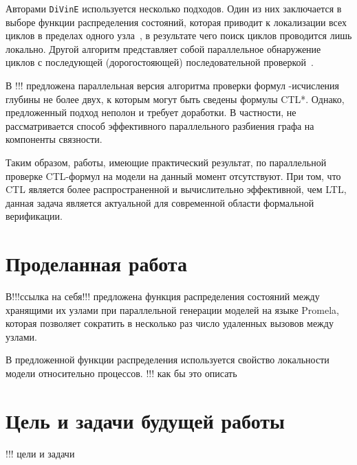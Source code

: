 \documentclass[a4paper,notitlepage,14pt]{article}
\begin{document}
Авторами \texttt{DiVinE} используется несколько подходов. Один из них заключается в выборе
функции распределения состояний, которая приводит к локализации всех циклов в пределах
одного узла~\cite{DLTL1}, в результате чего поиск циклов проводится лишь локально. Другой
алгоритм представляет собой параллельное обнаружение циклов с последующей (дорогостояющей)
последовательной проверкой~\cite{DLTL2}.

В !!! предложена параллельная версия алгоритма проверки формул \mu-исчисления глубины не
более двух, к которым могут быть сведены формулы CTL*. Однако, предложенный подход
неполон и требует доработки. В частности, не рассматривается способ эффективного
параллельного разбиения графа на компоненты связности.

Таким образом, работы, имеющие практический результат, по параллельной проверке CTL-формул
на модели на данный момент отсутствуют. При том, что CTL является более распространенной и
вычислительно эффективной, чем LTL, данная задача является актуальной для современной
области формальной верификации.

\section{Проделанная работа}
\label{sec:my-work}

В!!!ссылка на себя!!! предложена функция распределения состояний между хранящими их узлами
при параллельной генерации моделей на языке Promela, которая позволяет сократить в
несколько раз число удаленных вызовов между узлами. 

В предложенной функции распределения используется свойство локальности модели
относительно процессов.
!!! как бы это описать

\section{Цель и задачи будущей работы}
\label{sec:future-goals}

!!! цели и задачи



\end{document}
